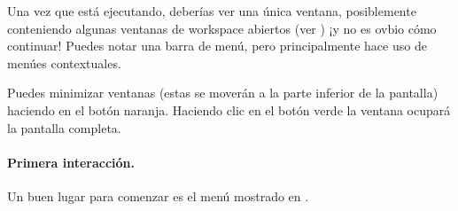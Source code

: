\documentclass[a4paper,10pt,twoside]{book}
\begin{document}
Una vez que \pharo est\'a ejecutando, deber\'ias ver una \'unica ventana, posiblemente conteniendo algunas ventanas de workspace abiertos (ver ) ¡y no es ovbio c\'omo continuar!
Puedes notar una barra de men\'u, pero principalmente \pharo hace uso de men\'ues contextuales.


Puedes minimizar ventanas (estas se mover\'an a la parte inferior de la pantalla) haciendo \click en el bot\'on naranja. Haciendo clic en el bot\'on verde la ventana ocupar\'a la pantalla completa.

\paragraph{Primera interacci\'on.}

Un buen lugar para comenzar es el men\'u  mostrado en .


\end{document}
